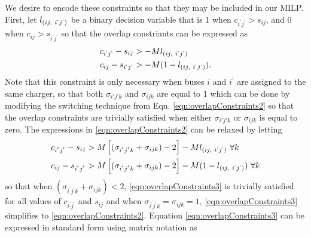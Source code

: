 
We desire to encode these constraints so that they may be included in our MILP. First, let $l_{\left( ij, \ i^{`}j^{`}\right )}$ be a binary decision variable that is $1$ when $c_{i^{'}j^{'}} > s_{ij}$, and $0$ when $c_{ij} > s_{i^{'}j^{'}}$ so that the overlap constriants can be expressed as 
	\begin{equation} \label{eqn:overlapConstraints2}\begin{aligned}
	c_{i^{`}j^{`}} - s_{ij}  &> -Ml_{\left( ij, \ i^{`}j^{`}\right )} \\
	c_{ij}-s_{i^{`}j^{`}} &>  -M(1 - l_{\left( ij, \ i^{`}j^{`}\right )}). 
\end{aligned}\end{equation}
	Note that this constraint is only necessary when buses $i$ and $i^{'}$ are assigned to the same charger, so that both $\sigma_{i'j'k}$ and $\sigma_{ijk}$ are equal to 1 which can be done by modifying the switching technique from Eqn. \eqref{eqn:overlapConstraints2} so that the overlap constraints are trivially satisfied when either $\sigma_{i'j'k}$ or $\sigma_{ijk}$ is equal to zero. The expressions in \eqref{eqn:overlapConstraints2} can be relaxed by letting 
\begin{equation}\label{eqn:overlapConstraints3}\begin{aligned}
	c_{i^{'}j^{'}} - s_{ij} &> M\left[(\sigma_{i^{'}j^{'}k} + \sigma_{ijk}) - 2\right] - Ml_{\left( ij, \ i^{`}j^{`}\right )} \ \forall k \\
	c_{ij} - s_{i^{'}j^{'}} &> M\left[(\sigma_{i^{'}j^{'}k} + \sigma_{ijk}) - 2\right] - M(1 - l_{\left( ij, \ i^{`}j^{`}\right )})\ \forall k \\
\end{aligned}\end{equation}
so that when $(\sigma_{i^{'}j^{'}k} + \sigma_{ijk}) < 2$, \eqref{eqn:overlapConstraints3} is trivially satisfied for all values of $c_{i^{'}j^{'}}$ and $s_{ij}$ and when $\sigma_{i^{'}j^{'}k} = \sigma_{ijk} = 1$, \eqref{eqn:overlapConstraints3} simplifies to \eqref{eqn:overlapConstraints2}. Equation \eqref{eqn:overlapConstraints3} can be expressed in standard form using matrix notation as 
